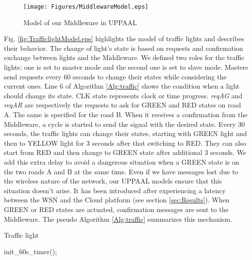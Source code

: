 \begin{figure*}[htbp]
\centering
\centerline{\texttt{[image: Figures/MiddlewareModel.eps]}}
\caption{Model of our Middleware in UPPAAL}
\label{fig:MiddlewareModel.eps}
\end{figure*}

Fig. \ref{fig:TrafficlightModel.eps} highlights the model of traffic lights and describes their behavior. The change of light's state is based on requests and confirmation exchange between lights and the Middleware. We defined two roles for the traffic lights: one is set to master mode and the second one is set to slave mode.
Masters send requests every 60 seconds to change their states while considering the current ones. Line 6 of Algorithm \ref{Alg:traffic} shows the condition when a light should change its state. CLK state represents clock or time progress.  \emph{reqAG} and \emph{reqAR} are respectively the requests to ask for GREEN and RED states on road A. The same is specified for the road B.  
When it receives a confirmation from the Middleware, a cycle is started to send the signal with the desired state. Every 30 seconds, the traffic lights can change their states, starting with GREEN light and then to YELLOW light for 3 seconds after that switching to RED. They can also start from RED and then change to GREEN state after additional 3 seconds. We add this extra delay to avoid a dangerous situation when a GREEN state is on the two roads A and B at the same time. Even if we have messages lost due to the wireless nature of the network, our UPPAAL models ensure that this situation doesn't arise. It has been introduced after experiencing a latency between the WSN and the Cloud platform (see section \ref{sec:Results}). When GREEN or RED states are actuated, confirmation messages are sent to the Middleware. 
The pseudo Algorithm \ref{Alg:traffic} summarizes this mechanism.

\LinesNumbered \begin{algorithm}[ht] \caption{Traffic light\label{Alg:traffic}}
init\_60s\_timer();
\end{algorithm}

